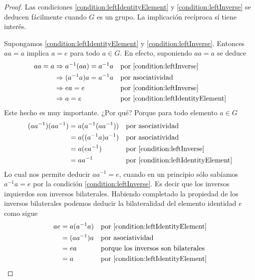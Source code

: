 \documentclass{report}
\theoremstyle{remark}
\begin{document}
  \begin{proof}
    Las condiciones \ref{condition:leftIdentityElement} y \ref{condition:leftInverse} se deducen fácilmente cuando \(G\) es un grupo.
    La implicación recíproca sí tiene interés.

    Supongamos \ref{condition:leftIdentityElement} y \ref{condition:leftInverse}.
    Entonces \(aa = a\) implica \(a = e\) para todo \(a \in G\).
    En efecto, suponiendo \(aa = a\) se deduce
    \begin{align}
      aa = a
      &\Rightarrow
      a^{- 1} (a a) = a^{- 1} a
      &&\text{por \ref{condition:leftInverse}}
      \\
      &\Rightarrow
      (a^{- 1} a) a = a^{- 1} a
      &&\text{por asociatividad}
      \\
      &\Rightarrow
      e a = e
      &&\text{por \ref{condition:leftInverse}}
      \\
      &\Rightarrow
      a = e
      &&\text{por \ref{condition:leftIdentityElement}}
    \end{align}
    Este hecho es muy importante.
    ¿Por qué?
    Porque para todo elemento \(a \in G\)
    \begin{align}
      (a a^{- 1}) (a a^{- 1})
      &=
      a (a^{- 1} (a a^{- 1}))
      &&\text{por asociatividad}
      \\
      &=
      a ((a^{- 1} a) a^{- 1})
      &&\text{por asociatividad}
      \\
      &=
      a (e a^{- 1})
      &&\text{por \ref{condition:leftInverse}}
      \\
      &=
      a a^{- 1}
      &&\text{por \ref{condition:leftIdentityElement}}
    \end{align}
    Lo cual nos permite deducir \(a a^{- 1} = e\), cuando en un principio sólo sabíamos \(a^{- 1} a = e\) por la condición \ref{condition:leftInverse}.
    Es decir que los inversos izquierdos son inversos bilaterales.
    Habiendo completado la propiedad de los inversos bilaterales podemos deducir la bilateralidad del elemento identidad \(e\) como sigue
    \begin{align}
      a e
      &=
      a (a^{- 1} a)
      &&\text{por \ref{condition:leftIdentityElement}}
      \\
      &=
      (a a^{- 1}) a
      &&\text{por asociatividad}
      \\
      &=
      e a
      &&\text{porque los inversos son bilaterales}
      \\
      &=
      a
      &&\text{por \ref{condition:leftIdentityElement}}
    \end{align}
  \end{proof}
\end{document}
